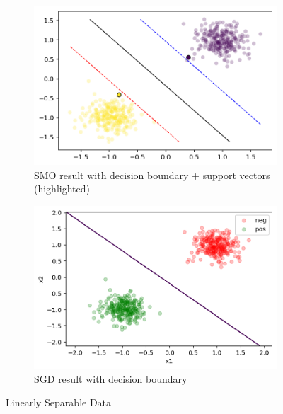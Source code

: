 \documentclass[10pt]{article}
\begin{document}
\begin{figure}
	\centering
	\begin{subfigure}{.5\textwidth}
		\centering
		\includegraphics[width=\linewidth]{fig1}
		\caption{SMO result with decision boundary + support vectors (highlighted)}
		\label{fig:linearSMO}
	\end{subfigure}%
	\begin{subfigure}{.5\textwidth}
		\centering
		\includegraphics[width=\linewidth]{fig2}
		\caption{SGD result with decision boundary}
		\label{fig:linearSGD}
	\end{subfigure}
	\caption{Linearly Separable Data}
	\label{fig:test}
\end{figure}
\end{document}
